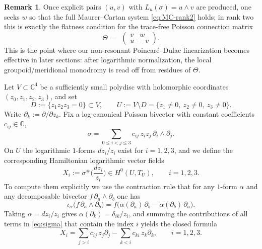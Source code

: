 \documentclass[11pt]{amsart}
\theoremstyle{plain}
\theoremstyle{definition}
\newtheorem{remark}[theorem]{Remark}
\theoremstyle{definition}
\begin{document}
\begin{remark}
Once explicit pairs $(u,v)$ with $L_u(\sigma)=u\wedge v$ are produced, one seeks $w$ so that the full
Maurer--Cartan system \eqref{eq:MC-rank2} holds; in rank two this is exactly the flatness condition for the
trace-free Poisson connection matrix \[
\Theta \;=\;
\begin{pmatrix}
v & w \\
u & -v
\end{pmatrix}.
\]
This is the point where our non-resonant Poincar\'e--Dulac linearization becomes effective in later sections:
after logarithmic normalization, the local groupoid/meridional monodromy is read off from residues of $\Theta$.
\end{remark}


  Let $V\subset\mathbb{C}^4$ be a sufficiently small polydisc with holomorphic coordinates $(z_0,z_1,z_2,z_3)$, and set
\begin{equation}\label{eq:D-U}
D:=\{z_1z_2z_3=0\}\subset V,
\qquad
U:=V\setminus D=\{z_1\neq 0,\ z_2\neq 0,\ z_3\neq 0\}.
\end{equation}
Write $\partial_k:=\partial/\partial z_k$. Fix a log-canonical Poisson bivector with constant coefficients $c_{ij}\in\mathbb{C}$,
\begin{equation}\label{eq:sigma}
\sigma=\sum_{0\le i<j\le 3} c_{ij}\,z_i z_j\,\partial_i\wedge\partial_j.
\end{equation}
On $U$ the logarithmic $1$-forms $dz_i/z_i$ exist for $i=1,2,3$, and we define the corresponding Hamiltonian logarithmic vector fields
\begin{equation}\label{eq:Xi-def}
X_i:=\sigma^\# \Big(\frac{dz_i}{z_i}\Big)\in H^0(U,T_U),\qquad i=1,2,3.
\end{equation}
To compute them explicitly we use the contraction rule that for any $1$-form $\alpha$ and any decomposable bivector $f\,\partial_a\wedge\partial_b$ one has
\begin{equation}\label{eq:contraction}
\iota_\alpha \bigl(f\,\partial_a\wedge\partial_b\bigr)
=f\bigl(\alpha(\partial_a)\,\partial_b-\alpha(\partial_b)\,\partial_a\bigr).
\end{equation}
Taking $\alpha=dz_i/z_i$ gives $\alpha(\partial_k)=\delta_{ik}/z_i$, and summing the contributions of all terms in \eqref{eq:sigma} that contain the index $i$ yields the closed formula
\begin{equation}\label{eq:Xi-closed}
X_i=\sum_{j>i} c_{ij}\,z_j\partial_j-\sum_{k<i} c_{k i}\,z_k\partial_k,\qquad i=1,2,3.
\end{equation}
\end{document}

